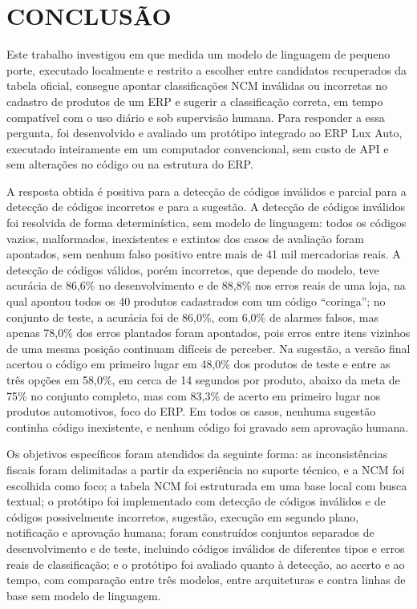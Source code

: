 \chapter{CONCLUSÃO}
\label{cap:conclusao}

Este trabalho investigou em que medida um modelo de linguagem de pequeno porte, executado localmente e restrito a escolher entre candidatos recuperados da tabela oficial, consegue apontar classificações NCM inválidas ou incorretas no cadastro de produtos de um ERP e sugerir a classificação correta, em tempo compatível com o uso diário e sob supervisão humana. Para responder a essa pergunta, foi desenvolvido e avaliado um protótipo integrado ao ERP Lux Auto, executado inteiramente em um computador convencional, sem custo de API e sem alterações no código ou na estrutura do ERP.

A resposta obtida é positiva para a detecção de códigos inválidos e parcial para a detecção de códigos incorretos e para a sugestão. A detecção de códigos inválidos foi resolvida de forma determinística, sem modelo de linguagem: todos os códigos vazios, malformados, inexistentes e extintos dos casos de avaliação foram apontados, sem nenhum falso positivo entre mais de 41 mil mercadorias reais. A detecção de códigos válidos, porém incorretos, que depende do modelo, teve acurácia de 86,6\% no desenvolvimento e de 88,8\% nos erros reais de uma loja, na qual apontou todos os 40 produtos cadastrados com um código ``coringa''; no conjunto de teste, a acurácia foi de 86,0\%, com 6,0\% de alarmes falsos, mas apenas 78,0\% dos erros plantados foram apontados, pois erros entre itens vizinhos de uma mesma posição continuam difíceis de perceber. Na sugestão, a versão final acertou o código em primeiro lugar em 48,0\% dos produtos de teste e entre as três opções em 58,0\%, em cerca de 14 segundos por produto, abaixo da meta de 75\% no conjunto completo, mas com 83,3\% de acerto em primeiro lugar nos produtos automotivos, foco do ERP. Em todos os casos, nenhuma sugestão continha código inexistente, e nenhum código foi gravado sem aprovação humana.

Os objetivos específicos foram atendidos da seguinte forma: as inconsistências fiscais foram delimitadas a partir da experiência no suporte técnico, e a NCM foi escolhida como foco; a tabela NCM foi estruturada em uma base local com busca textual; o protótipo foi implementado com detecção de códigos inválidos e de códigos possivelmente incorretos, sugestão, execução em segundo plano, notificação e aprovação humana; foram construídos conjuntos separados de desenvolvimento e de teste, incluindo códigos inválidos de diferentes tipos e erros reais de classificação; e o protótipo foi avaliado quanto à detecção, ao acerto e ao tempo, com comparação entre três modelos, entre arquiteturas e contra linhas de base sem modelo de linguagem.

